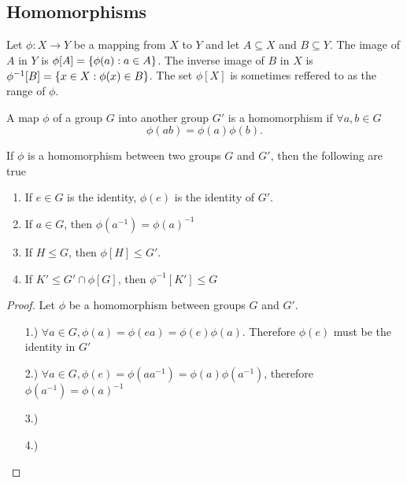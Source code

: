 \documentclass[../notes.tex]{subfiles}
\begin{document}

\subsection{Homomorphisms}

\begin{definition}
	Let $\phi : X \to Y$ be a mapping from $X$ to $Y$ and let $A \subseteq X$ and $B \subseteq Y$. The image of $A$ in $Y$ is $\phi[A] = \qty{\phi(a) : a \in A}$. The inverse image of $B$ in $X$ is $\phi^{-1}[B] = \qty{x \in X : \phi(x) \in B}$. The set $\phi[X]$ is sometimes reffered to as the range of $\phi$.
\end{definition}

\begin{definition}[Homomorphism]
	A map $\phi$ of a group $G$ into another group $G'$ is a homomorphism if $\forall a,b \in G$ \[\phi(ab) = \phi(a) \phi(b).\]
\end{definition}

\begin{theorem}
	\label{thm:propsofhomomorphism}
	If $\phi$ is a homomorphism between two groups $G$ and $G'$, then the following are true
	\begin{enumerate}
		\item If $e \in G$ is the identity, $\phi(e)$ is the identity of $G'$.
		\item If $a \in G$, then $\phi(a^{-1}) = \phi(a)^{-1}$
		\item If $H \leq G$, then $\phi[H] \leq G'$.
		\item If $K' \leq G' \cap \phi[G]$, then $\phi^{-1}[K'] \leq G$
	\end{enumerate}
\end{theorem}

\begin{proof}
	Let $\phi$ be a homomorphism between groups $G$ and $G'$.
	\begin{enumerate}
		\item[1.)]
			$\forall a \in G, \phi(a) = \phi(ea) = \phi(e) \phi(a)$. Therefore $\phi(e)$ must be the identity in $G'$
		\item[2.)] $\forall a \in G, \phi(e) = \phi(a a^{-1}) = \phi(a) \phi(a^{-1})$, therefore $\phi(a^{-1}) = \phi(a)^{-1}$
		\item[3.)] 
		\item[4.)] 
	\end{enumerate}
\end{proof}
\end{document}
